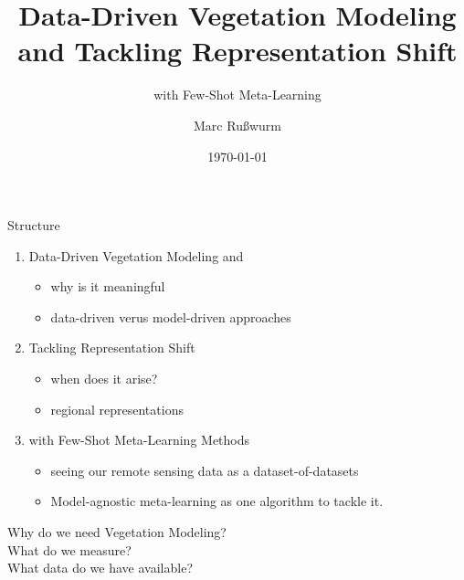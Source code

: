\documentclass[11pt]{beamer}
\begin{document}
	
	\title{Data-Driven Vegetation Modeling and Tackling Representation Shift}
	\subtitle{with Few-Shot Meta-Learning}
	\author{Marc Ru\ss{}wurm}
	\date{\today}
	
	
	\begin{frame}[plain]
		\maketitle
	\end{frame}

	\begin{frame}{Structure}
		
		\begin{enumerate}
			\item Data-Driven Vegetation Modeling and 
			\begin{itemize}
				\item why is it meaningful
				\item data-driven verus model-driven approaches
			\end{itemize}
			\item<2-> Tackling Representation Shift 
			\begin{itemize}
				\item when does it arise?
				\item regional representations
			\end{itemize}
			\item<3> with Few-Shot Meta-Learning Methods
			\begin{itemize}
				\item seeing our remote sensing data as a dataset-of-datasets
				\item Model-agnostic meta-learning as one algorithm to tackle it.
			\end{itemize}
		\end{enumerate}
		
	\end{frame}

	\begin{frame}[plain]
		\centering
		\hfill
		\Large
		
			Why do we need Vegetation Modeling?
			\\
			What do we measure?
			\\
			What data do we have available?
			
			
		\hfill
	\end{frame}
\end{document}

